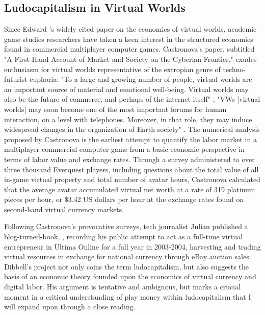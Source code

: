 \subsection*{Ludocapitalism in Virtual Worlds}
Since Edward \citeauthor{Castronova01}'s widely-cited \citeyear{Castronova01} paper on the economics of virtual worlds, academic game studies researchers have taken a keen interest in the structured economies found in commercial multiplayer computer games. Castronova's paper, subtitled "A First-Hand Account of Market and Society on the Cyberian Frontier," exudes enthusiasm for virtual worlds representative of the extropian genre of techno-futurist euphoria: "To a large and growing number of people, virtual worlds are an important source of material and emotional well-being. Virtual worlds may also be the future of commerce, and perhaps of the internet itself" \autocite[3]{Castronova01}; "VWs |virtual worlds| may soon become one of the most important forums for human interaction, on a level with telephones. Moreover, in that role, they may induce widespread changes in the organization of Earth society" \autocite[37]{Castronova01}. The numerical analysis proposed by Castronova is the earliest attempt to quantify the labor market in a multiplayer commercial computer game from a basic economic perspective in terms of labor value and exchange rates. Through a survey administered to over three thousand Everquest players, including questions about the total value of all in-game virtual property and total number of avatar hours, Castronova calculated that the average avatar accumulated virtual net worth at a rate of 319 platinum pieces per hour, or \$3.42 US dollars per hour at the exchange rates found on second-hand virtual currency markets.

Following Castronova's provocative surveys, tech journalist Julian \citeauthor{Dibbell2007-dd} published a blog-turned-book, , recording his public attempt to act as a full-time virtual entrepreneur in Ultima Online for a full year in 2003-2004, harvesting and trading virtual resources in exchange for national currency through eBay auction sales. Dibbell's project not only coins the term ludocapitalism, but also suggests the basis of an economic theory founded upon the economics of virtual currency and digital labor. His argument is tentative and ambiguous, but marks a crucial moment in a critical understanding of play money within ludocapitalism that I will expand upon through a close reading.

